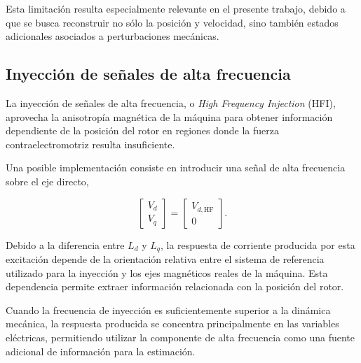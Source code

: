 Esta limitación resulta especialmente relevante en el presente trabajo, debido 
a que se busca reconstruir no sólo la posición y velocidad, sino también 
estados adicionales asociados a perturbaciones mecánicas.



\subsection{Inyección de señales de alta frecuencia}

%
%
%

La inyección de señales de alta frecuencia, o \textit{High Frequency 
Injection} (HFI), aprovecha la anisotropía magnética de la máquina para 
obtener información dependiente de la posición del rotor en regiones donde 
la fuerza contraelectromotriz resulta insuficiente.

Una posible implementación consiste en introducir una señal de alta frecuencia 
sobre el eje directo,

\begin{equation}
\begin{bmatrix}
V_d\\
V_q
\end{bmatrix}
=
\begin{bmatrix}
V_{d,\mathrm{HF}}\\
0
\end{bmatrix}.
\end{equation}

Debido a la diferencia entre $L_d$ y $L_q$, la respuesta de corriente 
producida por esta excitación depende de la orientación relativa entre el 
sistema de referencia utilizado para la inyección y los ejes magnéticos reales 
de la máquina. Esta dependencia permite extraer información relacionada con 
la posición del rotor.

Cuando la frecuencia de inyección es suficientemente superior a la dinámica 
mecánica, la respuesta producida se concentra principalmente en las variables 
eléctricas, permitiendo utilizar la componente de alta frecuencia como una 
fuente adicional de información para la estimación.

